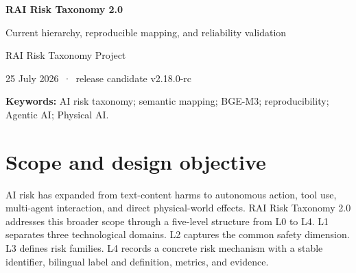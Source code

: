 \documentclass[11pt,a4paper]{article}
\begin{document}
\begin{center}
{\LARGE\bfseries RAI Risk Taxonomy 2.0\par}
\vspace{4pt}
{\large Current hierarchy, reproducible mapping, and reliability validation\par}
\vspace{8pt}
{\large RAI Risk Taxonomy Project\par}
\vspace{2pt}
25 July 2026 \,·\, release candidate v2.18.0-rc
\end{center}

\begin{abstract}
\noindent
RAI Risk Taxonomy 2.0 organizes responsible AI risks across General-purpose
AI, Agentic AI, and Physical AI. The current release preserves 1,711 registered
identifiers and distinguishes 1,660 independent active L4 cards from 51 merged
provenance records. A hybrid design combines standards-led hierarchy
construction with literature-derived L4 evidence. The current hierarchy
contains three semantic L2 categories and 54 semantic L3 families. Four
General-purpose AI families were added for societal impact, and nine former
Physical AI societal families were migrated into the shared General-purpose AI
branch. L4 placement uses BGE-M3 embeddings, bilingual L3 definitions,
centroid similarity, direct definition similarity, and keyword similarity under
domain constraints. Reproducibility is supported by fixed inputs, model
snapshot, deterministic seeds, content hashes, iteration traces, and invariant
tests. On 1,660 active cards, seeded spherical EM converges in 20 iterations at
a mean cosine objective of 0.8005. The released L3 appears within the nearest
centroid at Top-1 for 71.9\% of cards and within Top-5 for 95.2\%. These results
establish a reproducible current baseline while preserving human review for
semantically ambiguous cases.
\end{abstract}

\noindent\textbf{Keywords:} AI risk taxonomy; semantic mapping; BGE-M3;
reproducibility; Agentic AI; Physical AI.

\section{Scope and design objective}

AI risk has expanded from text-content harms to autonomous action, tool use,
multi-agent interaction, and direct physical-world effects. RAI Risk Taxonomy
2.0 addresses this broader scope through a five-level structure from L0 to L4.
L1 separates three technological domains. L2 captures the common safety
dimension. L3 defines risk families. L4 records a concrete risk mechanism with
a stable identifier, bilingual label and definition, metrics, and evidence.
\end{document}
